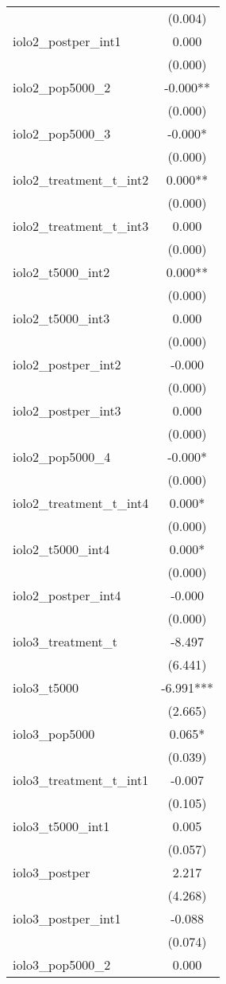 \documentclass[]{article}
\begin{document}
\begin{tabular}{lc}
 & (0.004) \\
iolo2\_postper\_int1 & 0.000 \\
 & (0.000) \\
iolo2\_pop5000\_2 & -0.000** \\
 & (0.000) \\
iolo2\_pop5000\_3 & -0.000* \\
 & (0.000) \\
iolo2\_treatment\_t\_int2 & 0.000** \\
 & (0.000) \\
iolo2\_treatment\_t\_int3 & 0.000 \\
 & (0.000) \\
iolo2\_t5000\_int2 & 0.000** \\
 & (0.000) \\
iolo2\_t5000\_int3 & 0.000 \\
 & (0.000) \\
iolo2\_postper\_int2 & -0.000 \\
 & (0.000) \\
iolo2\_postper\_int3 & 0.000 \\
 & (0.000) \\
iolo2\_pop5000\_4 & -0.000* \\
 & (0.000) \\
iolo2\_treatment\_t\_int4 & 0.000* \\
 & (0.000) \\
iolo2\_t5000\_int4 & 0.000* \\
 & (0.000) \\
iolo2\_postper\_int4 & -0.000 \\
 & (0.000) \\
iolo3\_treatment\_t & -8.497 \\
 & (6.441) \\
iolo3\_t5000 & -6.991*** \\
 & (2.665) \\
iolo3\_pop5000 & 0.065* \\
 & (0.039) \\
iolo3\_treatment\_t\_int1 & -0.007 \\
 & (0.105) \\
iolo3\_t5000\_int1 & 0.005 \\
 & (0.057) \\
iolo3\_postper & 2.217 \\
 & (4.268) \\
iolo3\_postper\_int1 & -0.088 \\
 & (0.074) \\
iolo3\_pop5000\_2 & 0.000 \\

\end{tabular}
\end{document}

